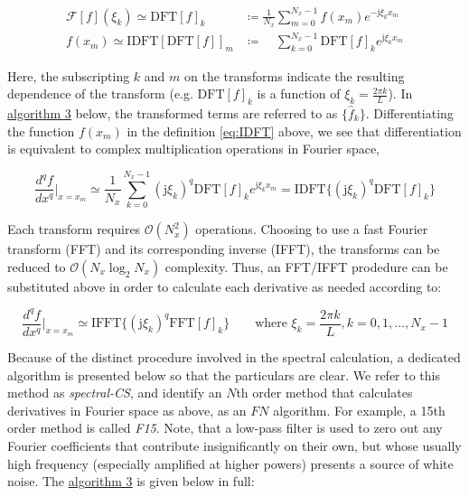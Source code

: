 \documentclass[11pt,titlepage]{report}
\begin{document}
\begin{subequations}
\begin{align}
\mathcal{F}[f](\xi_k) \simeq \text{DFT}[f]_k & \coloneqq  \frac{1}{N_x} \sum_{m = 0}^{N_x - 1} f(x_m) e^{-\text{j}\xi_k x_m} \label{eq:DFT}\\[0.3em] 
f(x_m) \simeq \text{IDFT}[\text{DFT}[f]]_m & \coloneqq  \phantom{\frac{1}{N_x}} \sum_{k = 0}^{N_x - 1}\text{DFT}[f]_k e^{\text{j}\xi_k x_m} \label{eq:IDFT}
\end{align}
\end{subequations}

\noindent Here, the subscripting $k$ and $m$ on the transforms indicate the resulting dependence of the transform (e.g. $\text{DFT}[f]_k$ is a function of $\xi_k = \tfrac{2\pi k}{L}$). In \hyperlink{alg:3}{algorithm 3} below, the transformed terms are referred to as $\{\hat{f}_k\}$. Differentiating the function $f(x_m)$ in the definition \eqref{eq:IDFT} above, we see that differentiation is equivalent to complex multiplication operations in Fourier space,



$$\frac{d^qf}{dx^q}\biggr|_{x = x_m}  \simeq  \frac{1}{N_x} \sum_{k = 0}^{N_x - 1}(\text{j}\xi_k)^q\text{DFT}[f]_k e^{\text{j}\xi_k x_m} = \text{IDFT}\{(\text{j}\xi_k)^q\text{DFT}[f]_k\}$$

\noindent Each transform requires $\mathcal{O}(N_x^2)$ operations. Choosing to use a fast Fourier transform (FFT) and its corresponding inverse (IFFT), the transforms can be reduced to $\mathcal{O}(N_x\log_2 N_x)$ complexity. Thus, an FFT/IFFT prodedure can be substituted above in order to calculate each derivative as needed according to:

\begin{equation}
\boxed{\frac{d^qf}{dx^q}\biggr|_{x = x_m}  \simeq \text{IFFT}\{(\text{j}\xi_k)^q\text{FFT}[f]_k\}} \qquad \text{where } \xi_k = \frac{2\pi k}{L}, k = 0, 1, \ldots, N_x - 1 \label{eq:FFT_deriv}
\end{equation}
 
\noindent Because of the distinct procedure involved in the spectral calculation, a dedicated algorithm is presented below so that the particulars are clear. We refer to this method as \emph{spectral-CS}, and identify an $N$th order method that calculates derivatives in Fourier space as above, as an $FN$ algorithm. For example, a 15th order method is called \emph{F15}. Note, that a low-pass filter is used to zero out any Fourier coefficients that contribute insignificantly on their own, but whose usually high frequency (especially amplified at higher powers) presents a source of white noise. The \hyperlink{alg:3}{algorithm 3} is given below in full:\\
\end{document}
